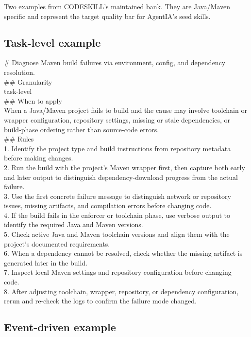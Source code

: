 \documentclass[11pt,a4paper]{article}
\begin{document}
Two examples from CODESKILL's maintained bank. They are Java/Maven
specific and represent the target quality bar for AgentIA's seed skills.

\subsection*{Task-level example}

\begin{promptbox}
\# Diagnose Maven build failures via environment, config, and dependency
resolution.\\[0.3em]
\#\# Granularity\\
task-level\\[0.3em]
\#\# When to apply\\
When a Java/Maven project fails to build and the cause may involve
toolchain or wrapper configuration, repository settings, missing or
stale dependencies, or build-phase ordering rather than source-code
errors.\\[0.3em]
\#\# Rules\\
1. Identify the project type and build instructions from repository
metadata before making changes.\\
2. Run the build with the project's Maven wrapper first, then capture
both early and later output to distinguish dependency-download progress
from the actual failure.\\
3. Use the first concrete failure message to distinguish network or
repository issues, missing artifacts, and compilation errors before
changing code.\\
4. If the build fails in the enforcer or toolchain phase, use verbose
output to identify the required Java and Maven versions.\\
5. Check active Java and Maven toolchain versions and align them with
the project's documented requirements.\\
6. When a dependency cannot be resolved, check whether the missing
artifact is generated later in the build.\\
7. Inspect local Maven settings and repository configuration before
changing code.\\
8. After adjusting toolchain, wrapper, repository, or dependency
configuration, rerun and re-check the logs to confirm the failure mode
changed.
\end{promptbox}

\subsection*{Event-driven example}
\end{document}
